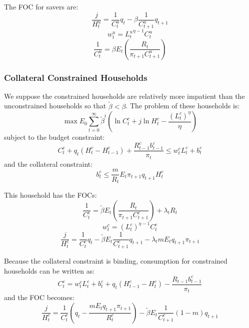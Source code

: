 \documentclass[11pt, a4paper]{article}
\begin{document}
The FOC for savers are:
\begin{equation}
  \frac{j}{H^{u}_t} = \frac{1}{C^{u}_{t}} q_t - \beta \frac{1}{C^{u}_{t+1}} q_{t+1}
\end{equation}
\begin{equation}
  w_t^u = {L_t^{u}}^{\eta -1} C^u_t
\end{equation}
\begin{equation}
\frac{1}{C_{t}^{u}}=\beta E_{t}\left(\frac{R_{t}}{\pi_{t+1} C_{t+1}^{u}}\right)
\end{equation}


\subsubsection{Collateral Constrained Households}

We suppose the constrained households are relatively more impatient than the unconstrained households so that $\tilde\beta < \beta$. The problem of these households is:
\begin{equation}
\max E_{0} \sum_{t=0}^{\infty} \widetilde{\beta}^{t}\left(\ln C_{t}^{c}+j \ln H_{t}^{c}-\frac{\left(L_{t}^{c}\right)^{\eta}}{\eta}\right)
\end{equation}
subject to the budget constraint:
\begin{equation}
C_{t}^{c}+q_{t}\left(H_{t}^{c}-H_{t-1}^{c}\right)+\frac{R_{t-1}^{c} b_{t-1}^{c}}{\pi_{t}} \leq w_{t}^{c} L_{t}^{c}+b_{t}^{c}
\end{equation}
and the collateral constraint:
\begin{equation}
b_{t}^{c} \leq \frac{m}{R_{t}} E_{t} \pi_{t+1} q_{t+1} H_{t}^{c}
\end{equation}

This household has the FOCs:
\begin{equation}
\frac{1}{C_{t}^{c}}=\widetilde{\beta} E_{t}\left(\frac{R_{t}}{\pi_{t+1} C_{t+1}^{c}}\right)+\lambda_{t} R_{t}
\end{equation}
\begin{equation}
w_{t}^{c}=\left(L_{t}^{c}\right)^{\eta-1} C_{t}^{c}
\end{equation}
\begin{equation}
\frac{j}{H_{t}^{c}}=\frac{1}{C_{t}^{c}} q_{t}-\widetilde{\beta} E_{t} \frac{1}{C_{t+1}^{c}} q_{t+1}-\lambda_{t} m E_{t} q_{t+1} \pi_{t+1}
\end{equation}

Because the collateral constraint is binding, consumption for constrained households can be written as:
\begin{equation}
C_{t}^{c}=w_{t}^{c} L_{t}^{c}+b_{t}^{c}+q_{t}\left(H_{t-1}^{c}-H_{t}^{c}\right)-\frac{R_{t-1} b_{t-1}^{c}}{\pi_{t}}
\end{equation}
and the FOC becomes:
\begin{equation}
\frac{j}{H_{t}^{c}}=\frac{1}{C_{t}^{c}}\left(q_{t}-\frac{m E_{t} q_{t+1} \pi_{t+1}}{R_{t}^{c}}\right)-\widetilde{\beta} E_{t} \frac{1}{C_{t+1}^{c}}(1-m) q_{t+1}
\end{equation}
\end{document}
